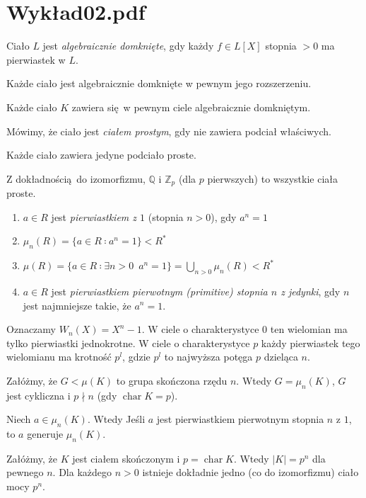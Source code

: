 \documentclass[a4paper, 12pt]{article}
\DeclareMathOperator{\Char}{char}
\newcommand{\+}{\enspace}
\begin{document}
\section*{Wykład02.pdf}
Ciało $L$ jest \textit{algebraicznie domknięte},
gdy każdy $f∈L[X]$ stopnia $>0$ ma pierwiastek w $L$.

Każde ciało jest algebraicznie domknięte w pewnym jego rozszerzeniu.

Każde ciało $K$ zawiera się w pewnym ciele algebraicznie domkniętym.


Mówimy, że ciało jest \textit{ciałem prostym}, gdy nie zawiera podciał właściwych.

Każde ciało zawiera jedyne podciało proste.

Z dokładnością do izomorfizmu,
$ℚ$ i $ℤ_p$ (dla $p$ pierwszych) to wszystkie ciała proste.


\begin{enumerate}
	\item $a∈R$ jest \textit{pierwiastkiem z $1$} (stopnia $n>0$), gdy $a^n=1$
	\item $μ_n(R) = \{ a∈R ∶ a^n=1 \} < R^*$
	\item $μ(R) = \{ a∈R ∶ ∃n>0\+ a^n=1 \} = \bigcup_{n>0} μ_n(R) < R^*$
	\item $a∈R$ jest \textit{pierwiastkiem pierwotnym (primitive) stopnia $n$ z jedynki},
		gdy $n$ jest najmniejsze takie, że $a^n=1$.
\end{enumerate}

Oznaczamy $W_n(X) = X^n-1$.
W ciele o charakterystyce $0$ ten wielomian ma tylko pierwiastki jednokrotne.
W ciele o charakterystyce $p$ każdy pierwiastek tego wielomianu ma krotność
$p^l$, gdzie $p^l$ to najwyższa potęga $p$ dzieląca $n$.

Załóżmy, że $G < μ(K)$ to grupa skończona rzędu $n$.
Wtedy $G = μ_n(K)$, $G$ jest cykliczna i $p \nmid n$ (gdy $\Char K = p$).

Niech $a∈μ_n(K)$. Wtedy
Jeśli $a$ jest pierwiastkiem pierwotnym stopnia $n$ z $1$, to
$a$ generuje $μ_n(K)$.

Załóżmy, że $K$ jest ciałem skończonym i $p = \Char K$.
Wtedy $|K|=p^n$ dla pewnego $n$.
Dla każdego $n>0$ istnieje dokładnie jedno (co do izomorfizmu)
ciało mocy $p^n$.
\end{document}
